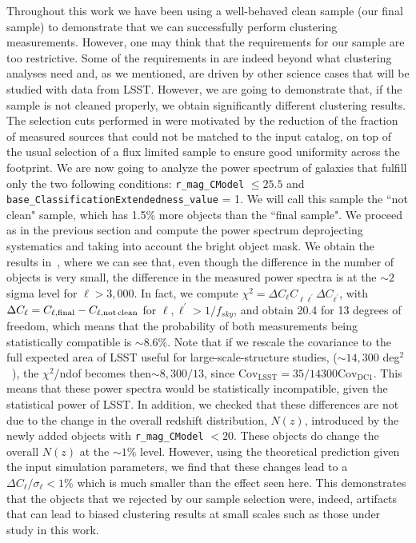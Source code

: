 \documentclass[a4paper,fleqn,usenatbib]{mnras}
\begin{document}
Throughout this work we have been using a well-behaved clean sample (our final sample) to demonstrate that we can successfully perform clustering measurements. However, one may think that the requirements for our sample are too restrictive. Some of the requirements in  are indeed beyond what clustering analyses need and, as we mentioned, are driven by other science cases that will be studied with data from LSST. However, we are going to demonstrate that, if the sample is not cleaned properly, we obtain significantly different clustering results. The selection cuts performed in  were motivated by the reduction of the fraction of measured sources that could not be matched to the input catalog, on top of the usual selection of a flux limited sample to ensure good uniformity across the footprint. We are now going to analyze the power spectrum of galaxies that fulfill only the two following conditions: \texttt{r\_mag\_CModel} $\leq 25.5$ and  \texttt{base\_ClassificationExtendedness\_value} = 1. We will call this sample the ``not clean" sample, which has 1.5\% more objects than the ``final sample". We proceed as in the previous section and compute the power spectrum deprojecting systematics and taking into account the bright object mask. We obtain the results in~, where we can see that, even though the difference in the number of objects is very small, the difference in the measured power spectra is at the $\sim 2$ sigma level for $\ell > 3,000$. In fact, we compute $\chi^{2} = \Delta C_{\ell} C_{\ell \ell^{\prime}} \Delta C_{\ell^{\prime}}$, with $\Delta C_{\ell} =  C_{\ell, \rm{final}} - C_{\ell, \rm{not\, clean}}$ for $\ell, \ell^{\prime} > 1/f_{sky}$, and obtain 20.4 for 13 degrees of freedom, which means that the probability of both measurements being statistically compatible is $\sim 8.6\%$. Note that if we rescale the covariance to the full expected area of LSST useful for large-scale-structure studies, ($\sim 14,300$ deg$^{2}$~\citealt{2018arXiv180901669T}), the $\chi^{2}$/ndof becomes then$\sim 8,300/13$, since $\mathrm{Cov_{LSST}}=35/14300 \mathrm{Cov_{DC1}}$. This means that these power spectra would be statistically incompatible, given the statistical power of LSST. In addition, we checked that these differences are not due to the change in the overall redshift distribution, $N(z)$, introduced by the newly added objects with \texttt{r\_mag\_CModel} $< 20$. These objects do change the overall $N(z)$ at the $\sim 1\%$ level. However, using the theoretical prediction given the input simulation parameters, we find that these changes lead to a $\Delta C_{\ell}/\sigma_{\ell}  < 1\%$ which is much smaller than the effect seen here. This demonstrates that the objects that we rejected by our sample selection were, indeed, artifacts that can lead to biased clustering results at small scales such as those under study in this work.
\end{document}
